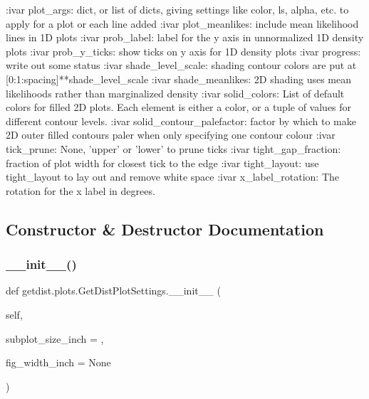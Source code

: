 \begin{DoxyVerb}
:ivar plot_args: dict, or list of dicts, giving settings like color, ls, alpha, etc. to apply for a plot or each line added
:ivar plot_meanlikes: include mean likelihood lines in 1D plots
:ivar prob_label: label for the y axis in unnormalized 1D density plots
:ivar prob_y_ticks: show ticks on y axis for 1D density plots
:ivar progress: write out some status
:ivar shade_level_scale: shading contour colors are put at [0:1:spacing]**shade_level_scale
:ivar shade_meanlikes: 2D shading uses mean likelihoods rather than marginalized density
:ivar solid_colors: List of default colors for filled 2D plots. Each element is either a color, or a tuple of values for different contour levels.
:ivar solid_contour_palefactor: factor by which to make 2D outer filled contours paler when only specifying one contour colour
:ivar tick_prune: None, 'upper' or 'lower' to prune ticks
:ivar tight_gap_fraction: fraction of plot width for closest tick to the edge
:ivar tight_layout: use tight_layout to lay out and remove white space
:ivar x_label_rotation: The rotation for the x label in degrees.
\end{DoxyVerb}
 

\subsection{Constructor \& Destructor Documentation}
\mbox{\label{classgetdist_1_1plots_1_1GetDistPlotSettings_a62fd20fea9f70d85837b5a769aa0025c}} 
\subsubsection{\texorpdfstring{\+\_\+\+\_\+init\+\_\+\+\_\+()}{\_\_init\_\_()}}
{\footnotesize\ttfamily def getdist.\+plots.\+Get\+Dist\+Plot\+Settings.\+\_\+\+\_\+init\+\_\+\+\_\+ (\begin{DoxyParamCaption}\item[{}]{self,  }\item[{}]{subplot\+\_\+size\+\_\+inch = {},  }\item[{}]{fig\+\_\+width\+\_\+inch = {\ttfamily None} }\end{DoxyParamCaption})}

